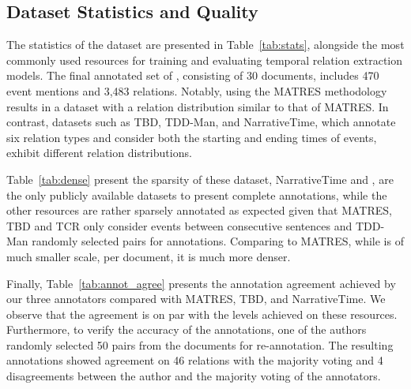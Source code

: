 



\subsection{Dataset Statistics and Quality}
\label{section:}
The statistics of the \App{} dataset are presented in Table~\ref{tab:stats}, alongside the most commonly used resources for training and evaluating temporal relation extraction models. The final annotated set of \App{}, consisting of 30 documents, includes 470 event mentions and 3,483 relations. Notably, using the MATRES methodology results in a dataset with a relation distribution similar to that of MATRES. In contrast, datasets such as TBD, TDD-Man, and NarrativeTime, which annotate six relation types and consider both the starting and ending times of events, exhibit different relation distributions.

Table~\ref{tab:dense} present the sparsity of these dataset, NarrativeTime and \App{}, are the only publicly available datasets to present complete annotations, while the other resources are rather sparsely annotated as expected given that MATRES, TBD and TCR only consider events between consecutive sentences and TDD-Man randomly selected pairs for annotations. Comparing to MATRES, while \App{} is of much smaller scale, per document, it is much more denser.

Finally, Table~\ref{tab:annot_agree} presents the annotation agreement achieved by our three annotators compared with MATRES, TBD, and NarrativeTime. We observe that the agreement is on par with the levels achieved on these resources. Furthermore, to verify the accuracy of the annotations, one of the authors randomly selected 50 pairs from the documents for re-annotation. The resulting annotations showed agreement on 46 relations with the majority voting and 4 disagreements between the author and the majority voting of the annotators.
